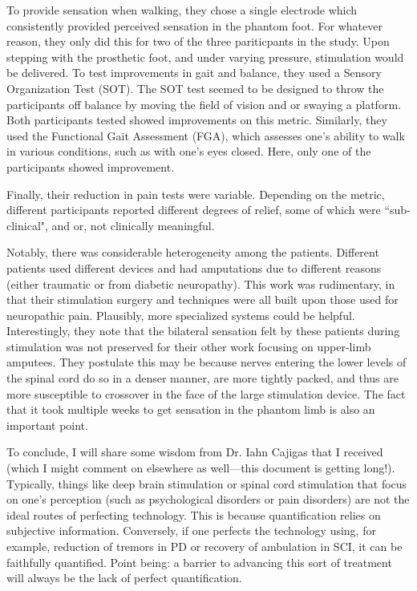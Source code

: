 To provide sensation when walking, they chose a single electrode which consistently provided perceived sensation in the phantom foot. For whatever reason, they only did this for two of the three pariticpants in the study. Upon stepping with the prosthetic foot, and under varying pressure, stimulation would be delivered. To test improvements in gait and balance, they used a Sensory Organization Test (SOT). The SOT test seemed to be designed to throw the participants off balance by moving the field of vision and or swaying a platform. Both participants tested showed improvements on this metric. Similarly, they used the Functional Gait Assessment (FGA), which assesses one's ability to walk in various conditions, such as with one's eyes closed. Here, only one of the participants showed improvement.\newline

Finally, their reduction in pain tests were variable. Depending on the metric, different participants reported different degrees of relief, some of which were ``sub-clinical", and or, not clinically meaningful.\newline

Notably, there was considerable heterogeneity among the patients. Different patients used different devices and had amputations due to different reasons (either traumatic or from diabetic neuropathy). This work was rudimentary, in that their stimulation surgery and techniques were all built upon those used for neuropathic pain. Plausibly, more specialized systems could be helpful. Interestingly, they note that the bilateral sensation felt by these patients during stimulation was not preserved for their other work focusing on upper-limb amputees. They postulate this may be because nerves entering the lower levels of the spinal cord do so in a denser manner, are more tightly packed, and thus are more susceptible to crossover in the face of the large stimulation device. The fact that it took multiple weeks to get sensation in the phantom limb is also an important point.\newline

To conclude, I will share some wisdom from Dr. Iahn Cajigas that I received (which I might comment on elsewhere as well---this document is getting long!). Typically, things like deep brain stimulation or spinal cord stimulation that focus on one's perception (such as psychological disorders or pain disorders) are not the ideal routes of perfecting technology. This is because quantification relies on subjective information. Conversely, if one perfects the technology using, for example, reduction of tremors in PD or recovery of ambulation in SCI, it can be faithfully quantified. Point being: a barrier to advancing this sort of treatment will always be the lack of perfect quantification. 


